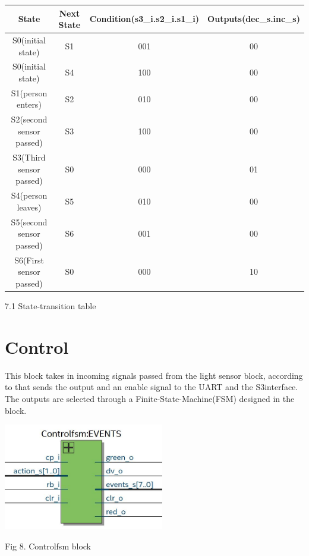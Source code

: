 \documentclass{article}
\begin{document}
\vspace{2cm}
 \begin{center}
  \begin{tabular}{|c|c|c|c|}
         \hline
        State& Next State& Condition(s3\_i.s2\_i.s1\_i)   & Outputs(dec\_s.inc\_s)\\
        \hline
        \hline
        S0(initial state) & S1 & 001 & 00 \\ 
        \hline
         S0(initial state) & S4 & 100 & 00 \\ 
        \hline
        S1(person enters) & S2 & 010 & 00 \\
        \hline 
        S2(second sensor passed) & S3 & 100 & 00 \\
        \hline
        S3(Third sensor passed) & S0 & 000 & 01\\
        \hline
          S4(person leaves)& S5  & 010   & 00\\  
        \hline
        S5(second sensor passed)   & S6    & 001   & 00 \\
        \hline 
        S6(First sensor passed) & S0   & 000  & 10 \\
        \hline
       
          \end{tabular}
          \end{center} 7.1 State-transition table \\
       
          \vspace{1cm}
 
          
          \newpage
\section{Control}
This block takes in incoming signals passed from the light sensor block, according to that  sends the output  and an enable signal to the UART and the S3interface. The outputs are selected through a Finite-State-Machine(FSM) designed in the block.

\vspace{0.5cm}
\begin{center}

\includegraphics[width=7cm]{cntrol.JPG}
\end{center}
Fig 8. Controlfsm block
\end{document}
